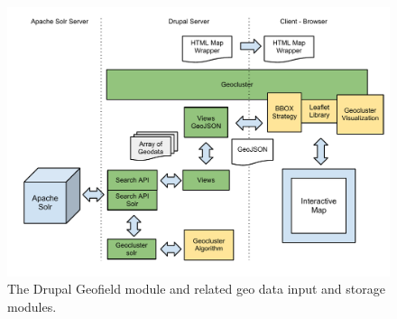 \begin{figure}[h]
  \begin{center}
    \includegraphics[width=1\textwidth]{figures/geocluster_solr_architecture.pdf}
    \caption{The Drupal Geofield module and related geo data input and storage modules.}
    \label{fig:geofield}
  \end{center}
\end{figure}
